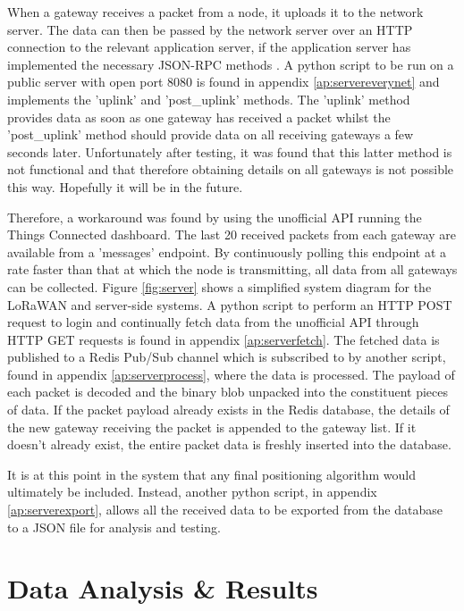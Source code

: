 \documentclass[a4paper]{report}
\begin{document}
    When a gateway receives a packet from a node, it uploads it to the network server. The data can then be passed by the network server over an HTTP connection to the relevant application server, if the application server has implemented the necessary JSON-RPC methods \cite{EverynetAPI}. A python script to be run on a public server with open port 8080 is found in appendix \ref{ap:servereverynet} and implements the 'uplink' and 'post\_uplink' methods. The 'uplink' method provides data as soon as one gateway has received a packet whilst the 'post\_uplink' method should provide data on all receiving gateways a few seconds later. Unfortunately after testing, it was found that this latter method is not functional and that therefore obtaining details on all gateways is not possible this way. Hopefully it will be in the future.

    Therefore, a workaround was found by using the unofficial API running the Things Connected dashboard. The last 20 received packets from each gateway are available from a 'messages' endpoint. By continuously polling this endpoint at a rate faster than that at which the node is transmitting, all data from all gateways can be collected. Figure \ref{fig:server} shows a simplified system diagram for the LoRaWAN and server-side systems. A python script to perform an HTTP POST request to login and continually fetch data from the unofficial API through HTTP GET requests is found in appendix \ref{ap:serverfetch}. The fetched data is published to a Redis Pub/Sub channel which is subscribed to by another script, found in appendix \ref{ap:serverprocess}, where the data is processed. The payload of each packet is decoded and the binary blob unpacked into the constituent pieces of data. If the packet payload already exists in the Redis database, the details of the new gateway receiving the packet is appended to the gateway list. If it doesn't already exist, the entire packet data is freshly inserted into the database.

    It is at this point in the system that any final positioning algorithm would ultimately be included. Instead, another python script, in appendix \ref{ap:serverexport}, allows all the received data to be exported from the database to a JSON file for analysis and testing.



\chapter{Data Analysis \& Results}
\end{document}
